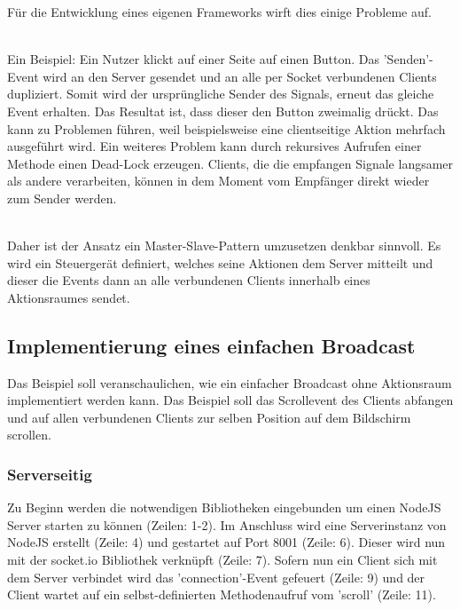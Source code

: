 Für die Entwicklung eines eigenen \Gls{Framework}s wirft dies einige Probleme auf.

\\ Ein  Beispiel: Ein Nutzer klickt auf einer Seite auf einen Button. Das 'Senden'-Event wird an den Server gesendet und an alle per Socket verbundenen Clients dupliziert. Somit wird der ursprüngliche Sender des Signals, erneut das gleiche \Gls{Event} erhalten. Das Resultat ist, dass dieser den Button zweimalig drückt. Das kann zu Problemen führen, weil beispielsweise eine clientseitige Aktion mehrfach ausgeführt wird. Ein weiteres Problem kann durch rekursives Aufrufen einer Methode einen Dead-Lock erzeugen. Clients, die die empfangen Signale langsamer als andere verarbeiten, können in dem Moment vom Empfänger direkt wieder zum Sender werden.
	
	\\Daher ist der Ansatz ein Master-Slave-Pattern umzusetzen denkbar sinnvoll. Es wird ein Steuergerät definiert, welches seine Aktionen dem Server mitteilt und dieser die \Gls{Event}s dann an alle verbundenen Clients innerhalb eines Aktionsraumes sendet.
	
	
	\subsection{Implementierung eines einfachen Broadcast}
	Das Beispiel soll veranschaulichen, wie ein einfacher Broadcast ohne Aktionsraum implementiert werden kann. Das Beispiel soll das Scrollevent des Clients abfangen und auf allen verbundenen Clients zur selben Position auf dem Bildschirm scrollen.
	
	\subsubsection{Serverseitig}
	Zu Beginn werden die notwendigen Bibliotheken eingebunden um einen \gls{NodeJS} Server starten zu können (Zeilen: 1-2). Im Anschluss wird  eine Serverinstanz von \gls{NodeJS} erstellt (Zeile: 4) und gestartet auf Port 8001 (Zeile: 6). Dieser wird nun mit der socket.io Bibliothek verknüpft (Zeile: 7). Sofern nun ein Client sich mit dem Server verbindet wird das 'connection'-Event gefeuert (Zeile: 9) und der Client wartet auf ein selbst-definierten Methodenaufruf vom 'scroll' (Zeile: 11).
	
